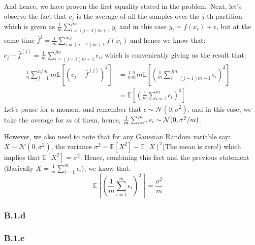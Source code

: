 \documentclass[]{article}
\begin{document}
        And hence, we have proven the first equality stated in the problem. Next, let's observe the fact that $c_j$ is the average of all the samples over the $j$ th partition which is given as $\frac{1}{m}\sum_{i = (j - 1)m + 1}^{jm}y_i$ and in this case $y_i = f(x_i) + \epsilon$, but at the same time $\bar{f}^{j} = \frac{1}{m}\sum_{i = (j - 1)m + 1}^{mj}f(x_i)$ and hence we know that: $c_j - \bar{f}^{(j)} = \frac{1}{m}\sum_{i = (j - 1)m + 1}^{jm}\epsilon_i$, which is conveniently giving us the result that: 
        \begin{align*}\tag{B.1.c.3}\label{eqn:B.1.c.3}
            \frac{1}{n}\sum_{j = 1}^{n/m}
            m\mathbb{E}\left[
                (c_j - \bar{f}^{(j)})^2
            \right]
            &=
            \frac{1}{n}\frac{n}{m}m \mathbb{E}\left[
                \left(
                    \frac{1}{m}\sum_{i = (j - 1)m + 1}^{jm}\epsilon_i
                \right)^2
            \right]
            \\
            &= \mathbb{E}\left[
                \left(
                    \frac{1}{m}\sum_{i = 1}^{m}\epsilon_i
                \right)^2
            \right]
        \end{align*}
        Let's pause for a moment and remember that $\epsilon \sim \mathcal{N}(0, \sigma^2)$, and in this case, we take the average for $m$ of them, hence, $\frac{1}{m}\sum_{i = `'}^{m}\epsilon_i\sim \mathcal{N}(0, \sigma^2/m)$. 
        \par
        However, we also need to note that for any Gaussian Random variable say: $X\sim \mathcal{N}(0, \sigma^2)$, the variance $\sigma^2 = \mathbb{E}\left[X^2\right] - \mathbb{E}\left[X\right]^2$(The mean is zero!) which implies that $\mathbb{E}\left[X^2\right] = \sigma^2$. Hence, combining this fact and the previous statement (Basically $X = \frac{1}{m}\sum_{i = 1}^{m}\epsilon_i$), we know that: 
        \begin{equation*}\tag{B.1.c.4}\label{eqn:B.1.c.4}
            \mathbb{E}\left[
                \left(
                    \frac{1}{m}\sum_{i = 1}^{m}\epsilon_i
                \right)^2
            \right] = \frac{\sigma^2}{m}
        \end{equation*}
    \subsubsection*{B.1.d}
        
    \subsubsection*{B.1.e}
        
\end{document}
